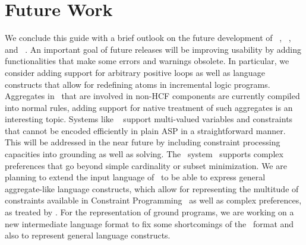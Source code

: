 \section{Future Work}\label{sec:future}

We conclude this guide with a brief outlook on the future development
of \gringo~\cite{gescth07a}, \clasp~\cite{gekasc09c}, and \clingo~\cite{gekakasc14b,gekakaosscwa16a}.
An important goal of future releases will be improving usability
by adding functionalities that make some errors and warnings obsolete.
In particular, we consider adding support for arbitrary positive loops
as well as language constructs that allow for redefining atoms in incremental logic programs.
Aggregates in \clasp\ that are involved in non-HCF components are currently compiled into normal rules,
adding support for native treatment of such aggregates is an interesting topic.
Systems like \clingcon~\cite{geossc09a,ostsch12a} support multi-valued variables and constraints that cannot be encoded efficiently in plain ASP in a straightforward manner.
This will be addressed in the near future by including constraint processing capacities into grounding as well as solving.
The \asprin\ system~\cite{brderosc15a} supports complex preferences that go beyond simple cardinality or subset minimization.
We are planning to extend the input language of \gringo\ to be able to express general aggregate-like language constructs,
which allow for representing the multitude of constraints available in Constraint Programming~\cite{CPHandbook} 
as well as complex preferences, as treated by \asprin.
For the representation of ground programs,
we are working on a new intermediate language format to fix some shortcomings of the \smodels\ format
and also to represent general language constructs.

